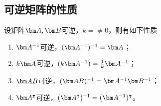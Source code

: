 \subsection{可逆矩阵的性质}\label{sec:可逆矩阵的性质}
设矩阵$\mat{A},\mat{B}$可逆，$k=\neq 0$，则有如下性质
\begin{enumerate}[(1)]
    \item $\mat{A}^{-1}$可逆，$(\mat{A}^{-1})^{-1} = \mat{A}$；
    \item $k\mat{A}$可逆，$(k\mat{A}^{-1}) = \frac{1}{k} \mat{A}^{-1}$；
    \item $\mat{AB}$可逆，$(\mat{AB})^{-1} = \mat{A}^{-1}\mat{B}^{-1}$；
    \item $\mat{A}^\intercal$可逆，$(\mat{A}^\intercal)^{-1} = (\mat{A}^{-1})^\intercal$。
\end{enumerate}

\pagebreak
